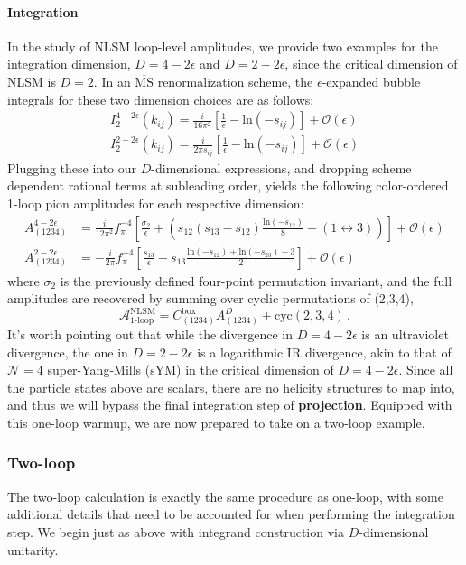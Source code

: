 \documentclass[11pt,letter]{article}
\begin{document}
\paragraph{\textbf{Integration}}  In the study of NLSM loop-level amplitudes, we provide two examples for the integration dimension, $D=4-2\epsilon$ and $D=2-2\epsilon$, since the critical dimension of NLSM is $D=2$. In an $\overline{\text{MS}}$ renormalization scheme, the $\epsilon$-expanded bubble integrals for these two dimension choices are as follows:
\begin{align}
I_2^{4-2\epsilon}(k_{ij}) = \frac{i}{16\pi^2}\left[\frac{1}{\epsilon} - \text{ln}(-s_{ij})\right]+\mathcal{O}(\epsilon)
\\
I_2^{2-2\epsilon}(k_{ij}) = \frac{i}{2\pi s_{ij}}\left[\frac{1}{\epsilon} - \text{ln}(-s_{ij})\right]+\mathcal{O}(\epsilon)
\end{align}
Plugging these into our $D$-dimensional expressions, and dropping scheme dependent rational terms at subleading order, yields the following color-ordered 1-loop pion amplitudes for each respective dimension:
\begin{align}
A^{4-2\epsilon}_{(1234)} &=\frac{i}{12\pi^2 }f_{\pi}^{-4}\left[\frac{\sigma_2}{\epsilon}+\left(s_{12}(s_{13}-s_{12})\frac{\text{ln}(-s_{12})}{8}+(1\leftrightarrow 3)\right)\right]+\mathcal{O}(\epsilon)
\\
A^{2-2\epsilon}_{(1234)} &= -\frac{i}{2\pi }f_{\pi}^{-4}\left[\frac{s_{13}}{\epsilon}-s_{13}\frac{\text{ln}(-s_{12})+\text{ln}(-s_{23})-3}{2}\right] +\mathcal{O}(\epsilon) \label{eq:1loopPionD2}
\end{align}
where $\sigma_2$ is the previously defined four-point permutation invariant, and the full amplitudes are recovered by summing over cyclic permutations of (2,3,4), 
\begin{equation}
\mathcal{A}^{\text{NLSM}}_{\text{1-loop}} = C^{\text{box}}_{(1234)}A^{D}_{(1234)}+\text{cyc}(2,3,4)\,.
\end{equation} 
It's worth pointing out that while the divergence in $D=4-2\epsilon$ is an ultraviolet divergence, the one in $D=2-2\epsilon$ is a logarithmic IR divergence, akin to that of $\mathcal{N}=4$ super-Yang-Mills (sYM) in the critical dimension of $D=4-2\epsilon$. Since all the particle states above are scalars, there are no helicity structures to map into, and thus we will bypass the final integration step of \textbf{projection}. Equipped with this one-loop warmup, we are now prepared to take on a two-loop example. 
\subsubsection{Two-loop}\label{sec:2loopNLSM}
The two-loop calculation is exactly the same procedure as one-loop, with some additional details that need to be accounted for when performing the integration step. We begin just as above with integrand construction via $D$-dimensional unitarity. 
\end{document}
